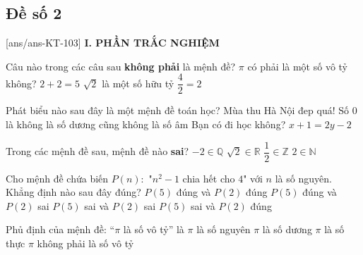 \subsection*{Đề số 2}
\setcounter{ex}{0}\setcounter{bt}{0}
[ans/ans-KT-103]
\noindent\textbf{I. PHẦN TRẮC NGHIỆM}
\begin{ex}%
	Câu nào trong các câu sau \textbf{không phải} là mệnh đề?
	\choice
	{\True $\pi$ có phải là một số vô tỷ không?}
	{$2+2=5$}
	{$\sqrt{2}$ là một số hữu tỷ}
	{$\dfrac{4}{2}=2$}
\end{ex}
\begin{ex}%
	Phát biểu nào sau đây là một mệnh đề toán học?
	\choice
	{Mùa thu Hà Nội đep quá!}
	{\True Số 0 là không là số dương cũng không là số âm}
	{Bạn có đi học không?}
	{$x+1=2y-2$}
\end{ex}
\begin{ex}%
	Trong các mệnh đề sau, mệnh đề nào \textbf{sai}?
	\choice
	{$-2 \in \mathbb{Q}$}
	{$\sqrt{2} \in \mathbb{R}$}
	{\True $\dfrac{1}{2} \in \mathbb{Z}$}
	{$2 \in \mathbb{N}$}
\end{ex}
\begin{ex}%
	Cho mệnh đề chứa biến $P(n) \colon$ "$n^2-1$ chia hết cho $4$" với $n$ là số nguyên. Khẳng định nào sau đây đúng?
	\choice
	{$P(5)$ đúng và $P(2)$ đúng}
	{\True $P(5)$ đúng và $P(2)$ sai}
	{$P(5)$ sai và $P(2)$ sai}
	{$P(5)$ sai và $P(2)$ đúng}
\end{ex}
\begin{ex}%
	Phủ định của mệnh đề: ``$\pi$ là số vô tỷ'' là
	\choice
	{$\pi$ là số nguyên}
	{$\pi$ là số dương}
	{$\pi$ là số thực}
	{\True $\pi$ không phải là số vô tỷ}	
\end{ex}
